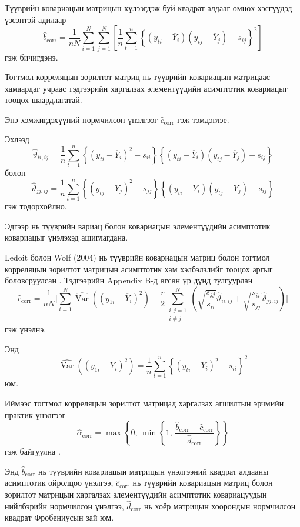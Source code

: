 Түүврийн ковариацын матрицын
хүлээгдэж буй квадрат алдааг өмнөх хэсгүүдэд үзсэнтэй адилаар 
\[
\widehat b_{\mathrm{corr}}
=
\frac{1}{nN}
\sum_{i=1}^{N}\sum_{j=1}^{N}
\left[
\frac{1}{n}
\sum_{t=1}^{n}
\left\{
(y_{ti}-\overline{Y}_i)
(y_{tj}-\overline{Y}_j)-s_{ij}
\right\}^2
\right]
\]
гэж бичигдэнэ.

Тогтмол корреляцын зорилтот матриц
нь түүврийн ковариацын матрицаас
хамаардаг учраас тэдгээрийн
харгалзах элементүүдийн
асимптотик ковариацыг тооцох
шаардлагатай.

Энэ хэмжигдэхүүний нормчилсон
үнэлгээг $\widehat c_{\mathrm{corr}}$
гэж тэмдэглэе.

Эхлээд
\[
\widehat{\vartheta}_{ii,ij}
=
\frac{1}{n}
\sum_{t=1}^{n}
\left\{
(y_{ti}-\overline{Y}_i)^2-s_{ii}
\right\}
\left\{
(y_{ti}-\overline{Y}_i)
(y_{tj}-\overline{Y}_j)-s_{ij}
\right\}
\]
болон
\[
\widehat{\vartheta}_{jj,ij}
=
\frac{1}{n}
\sum_{t=1}^{n}
\left\{
(y_{tj}-\overline{Y}_j)^2-s_{jj}
\right\}
\left\{
(y_{ti}-\overline{Y}_i)
(y_{tj}-\overline{Y}_j)-s_{ij}
\right\}
\]
гэж тодорхойлно.

Эдгээр нь түүврийн вариац болон
ковариацын элементүүдийн
асимптотик ковариацыг үнэлэхэд
ашиглагдана.

Ledoit болон Wolf (2004) нь түүврийн ковариацын
матриц болон тогтмол корреляцын зорилтот матрицын
асимптотик хам хэлбэлзлийг тооцох аргыг
боловсруулсан \citep{ledoitwolf2004b}.
Тэдгээрийн Appendix B-д өгсөн үр дүнд тулгуурлан
\[
	\widehat c_{\mathrm{corr}}
	=
	\frac{1}{nN}
	\Bigg[
	\sum_{i=1}^{N}
	\widehat{\operatorname{Var}}
	\left((y_{1i}-\overline{Y}_i)^2\right)+
	\frac{\bar r}{2}
	\sum_{\substack{i,j=1\\i\neq j}}^{N}
	\left(
	\sqrt{\frac{s_{jj}}{s_{ii}}}
	\widehat{\vartheta}_{ii,ij}
	+
	\sqrt{\frac{s_{ii}}{s_{jj}}}
	\widehat{\vartheta}_{jj,ij}
	\right)
	\Bigg]
\]
гэж үнэлнэ.

Энд
\[
\widehat{\operatorname{Var}}
\left((y_{1i}-\overline{Y}_i)^2\right)
=
\frac{1}{n}
\sum_{t=1}^{n}
\left\{
(y_{ti}-\overline{Y}_i)^2-s_{ii}
\right\}^2
\]
юм.

Иймээс тогтмол корреляцын
зорилтот матрицад харгалзах
агшилтын эрчмийн практик үнэлгээг
\[
\widehat{\alpha}_{\mathrm{corr}}
=
\max\left\{
0,\,
\min\left\{
1,\,
\frac{
	\widehat b_{\mathrm{corr}}
	-
	\widehat c_{\mathrm{corr}}
}{
	\widehat d_{\mathrm{corr}}
}
\right\}
\right\}
\]
гэж байгуулна \citep{ledoitwolf2004b}.

Энд $\widehat b_{\mathrm{corr}}$ нь
түүврийн ковариацын матрицын
үнэлгээний квадрат алдааны
асимптотик ойролцоо үнэлгээ,
$\widehat c_{\mathrm{corr}}$ нь
түүврийн ковариацын матриц болон
зорилтот матрицын харгалзах
элементүүдийн асимптотик
ковариацуудын нийлбэрийн
нормчилсон үнэлгээ,
$\widehat d_{\mathrm{corr}}$ нь
хоёр матрицын хоорондын
нормчилсон квадрат Фробениусын
зай юм.

